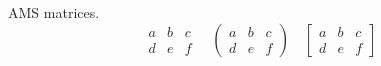 \documentclass{article}
\begin{document}
	AMS matrices.
	\[
	\begin{matrix}
		a & b & c \\
		d & e & f
	\end{matrix}
	\quad
	\begin{pmatrix}
		a & b & c \\
		d & e & f
	\end{pmatrix}
	\quad
	\begin{bmatrix}
		a & b & c \\
		d & e & f
	\end{bmatrix}
	\]
\end{document}
